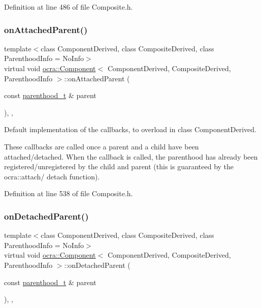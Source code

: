 Definition at line 486 of file Composite.\+h.

\hypertarget{classocra_1_1Component_aa59ac72499ba7d314d9602b081d0b475}{}\label{classocra_1_1Component_aa59ac72499ba7d314d9602b081d0b475} 
\subsubsection{\texorpdfstring{on\+Attached\+Parent()}{onAttachedParent()}}
{\footnotesize\ttfamily template$<$class Component\+Derived, class Composite\+Derived, class Parenthood\+Info = No\+Info$>$ \\
virtual void \hyperlink{classocra_1_1Component}{ocra\+::\+Component}$<$ Component\+Derived, Composite\+Derived, Parenthood\+Info $>$\+::on\+Attached\+Parent (\begin{DoxyParamCaption}\item[{const \hyperlink{classocra_1_1Component_a70fb7cda78934a9f017c7e46c1407953}{parenthood\+\_\+t} \&}]{parent }\end{DoxyParamCaption})\hspace{0.3cm}{\ttfamily [inline]}, {\ttfamily [protected]}, {\ttfamily [virtual]}}



Default implementation of the callbacks, to overload in class Component\+Derived. 

These callbacks are called once a parent and a child have been attached/detached. When the callback is called, the parenthood has already been registered/unregistered by the child and parent (this is guaranteed by the ocra\+::attach/ detach function). 

Definition at line 538 of file Composite.\+h.

\hypertarget{classocra_1_1Component_a0dd26028434be8efbebccb088ddbec65}{}\label{classocra_1_1Component_a0dd26028434be8efbebccb088ddbec65} 
\subsubsection{\texorpdfstring{on\+Detached\+Parent()}{onDetachedParent()}}
{\footnotesize\ttfamily template$<$class Component\+Derived, class Composite\+Derived, class Parenthood\+Info = No\+Info$>$ \\
virtual void \hyperlink{classocra_1_1Component}{ocra\+::\+Component}$<$ Component\+Derived, Composite\+Derived, Parenthood\+Info $>$\+::on\+Detached\+Parent (\begin{DoxyParamCaption}\item[{const \hyperlink{classocra_1_1Component_a70fb7cda78934a9f017c7e46c1407953}{parenthood\+\_\+t} \&}]{parent }\end{DoxyParamCaption})\hspace{0.3cm}{\ttfamily [inline]}, {\ttfamily [protected]}, {\ttfamily [virtual]}}



